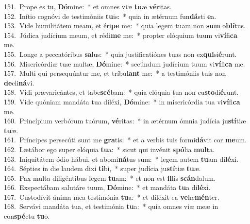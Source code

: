 {151.~}Prope es tu, \textbf{Dó}mine:~* et omnes viæ \textbf{tu}æ \textbf{vé}ritas.\\
{152.~}Inítio cognóvi de testimóniis \textbf{tu}is:~* quia in ætérnum fun\textbf{dá}sti \textbf{e}a.\\
{153.~}Vide humilitátem meam, et éri\textbf{pe} me:~* quia legem tuam non \textbf{sum} o\textbf{blí}tus.\\
{154.~}Júdica judícium meum, et rédi\textbf{me} me:~* propter elóquium tuum vi\textbf{ví}fi\textbf{ca} me.\\
{155.~}Longe a peccatóribus \textbf{sa}lus:~* quia justificatiónes tuas non ex\textbf{qui}si\textbf{é}runt.\\
{156.~}Misericórdiæ tuæ multæ, \textbf{Dó}mine:~* secúndum judícium tuum vi\textbf{ví}fi\textbf{ca} me.\\
{157.~}Multi qui persequúntur me, et tríbu\textbf{lant} me:~* a testimóniis tuis non \textbf{de}cli\textbf{ná}vi.\\
{158.~}Vidi prævaricántes, et tabe\textbf{scé}bam:~* quia elóquia tua non cu\textbf{sto}di\textbf{é}runt.\\
{159.~}Vide quóniam mandáta tua diléxi, \textbf{Dó}mine:~* in misericórdia tua vi\textbf{ví}fi\textbf{ca} me.\\
{160.~}Princípium verbórum tuórum, \textbf{vé}ritas:~* in ætérnum ómnia judícia ju\textbf{stí}tiæ \textbf{tu}æ.\\
{161.~}Príncipes persecúti sunt me \textbf{gra}tis:~* et a verbis tuis formi\textbf{dá}vit cor \textbf{me}um.\\
{162.~}Lætábor ego super elóquia \textbf{tu}a:~* sicut qui invénit \textbf{spó}lia \textbf{mul}ta.\\
{163.~}Iniquitátem ódio hábui, et abomi\textbf{ná}tus sum:~* legem autem \textbf{tu}am di\textbf{lé}xi.\\
{164.~}Sépties in die laudem dixi \textbf{ti}bi,~* super judícia ju\textbf{stí}tiæ \textbf{tu}æ.\\
{165.~}Pax multa diligéntibus legem \textbf{tu}am:~* et non est \textbf{il}lis \textbf{scán}dalum.\\
{166.~}Exspectábam salutáre tuum, \textbf{Dó}mine:~* et mandáta \textbf{tu}a di\textbf{lé}xi.\\
{167.~}Custodívit ánima mea testimónia \textbf{tu}a:~* et diléxit ea \textbf{ve}he\textbf{mén}ter.\\
{168.~}Servávi mandáta tua, et testimónia \textbf{tu}a:~* quia omnes viæ meæ in con\textbf{spé}ctu \textbf{tu}o.\\
